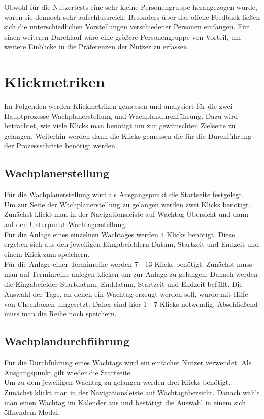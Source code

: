 \documentclass[fontsize=12pt,openright,oneside,paper=a4,BCOR=1cm]{scrbook}
\begin{document}
Obwohl für die Nutzertests eine sehr kleine Personengruppe herangezogen wurde, waren sie dennoch sehr aufschlussreich. Besonders über das offene Feedback ließen sich die unterschiedlichen Vorstellungen verschiedener Personen einfangen. Für einen weiteren Durchlauf wäre eine größere Personengruppe von Vorteil, um weitere Einblicke in die Präferenzen der Nutzer zu erfassen.

\section{Klickmetriken}
Im Folgenden werden Klickmetriken gemessen und analysiert für die zwei Hauptprozesse Wachplanerstellung und Wachplandurchführung. Dazu wird betrachtet, wie viele Klicks man benötigt um zur gewünschten Zielseite zu gelangen. Weiterhin werden dann die Klicks gemessen die für die Durchführung der Prozessschritte benötigt werden.

\subsection{Wachplanerstellung}
Für die Wachplanerstellung wird als Ausgangspunkt die Startseite festgelegt. \\
Um zur Seite der Wachplanerstellung zu gelangen werden zwei Klicks benötigt. Zunächst klickt man in der Navigationsleiste auf \glqq Wachtag Übersicht\grqq{} und dann auf den Unterpunkt \glqq Wachtagerstellung\grqq{}. \\
Für die Anlage eines einzelnen Wachtages werden 4 Klicks benötigt. Diese ergeben sich aus den jeweiligen Eingabefeldern \glqq Datum\grqq{}, \glqq Startzeit\grqq{} und \glqq Endzeit\grqq{} und einem Klick zum speichern. \\
Für die Anlage einer Terminreihe werden 7 - 13 Klicks benötigt. Zunächst muss man auf \glqq Terminreihe anlegen\grqq{} klicken um zur Anlage zu gelangen. Danach werden die Eingabefelder \glqq Startdatum\grqq{}, \glqq Enddatum\grqq{}, \glqq Startzeit\grqq{} und \glqq Endzeit\grqq{} befüllt. Die Auswahl der Tage, an denen ein Wachtag erzeugt werden soll, wurde mit Hilfe von Checkboxen umgesetzt. Daher sind hier 1 - 7 Klicks notwendig. Abschließend muss man die Reihe noch speichern. 

\subsection{Wachplandurchführung}
Für die Durchführung eines Wachtags wird ein einfacher Nutzer verwendet. Als Ausgangspunkt gilt wieder die Startseite. \\
Um zu dem jeweiligen Wachtag zu gelangen werden drei Klicks benötigt. Zunächst klickt man in der Navigationsleiste auf \glqq Wachtagübersicht\grqq{}. Danach wählt man einen Wachtag im Kalender aus und bestätigt die Auswahl in einem sich öffnendem Modal. 
\end{document}
